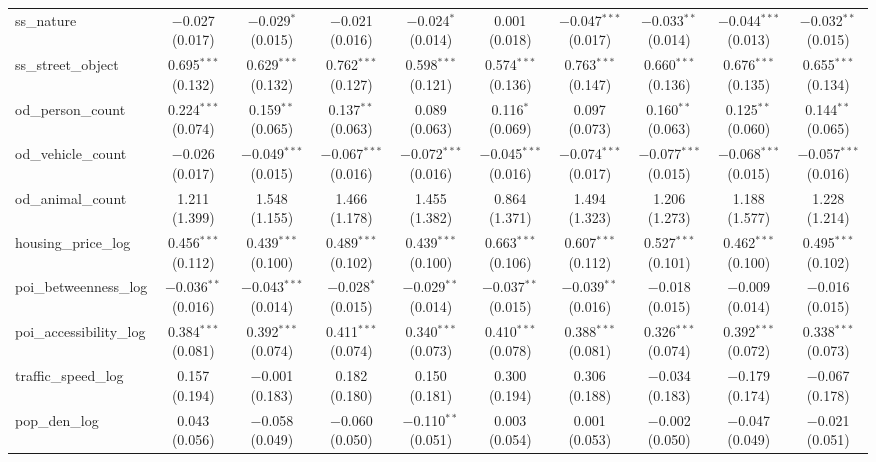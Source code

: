 \begin{table}[!htbp]
\begin{tabular}{@{\extracolsep{1pt}}lccccccccc}
  ss\_nature & $-$0.027 (0.017) & $-$0.029$^{*}$ (0.015) & $-$0.021 (0.016) & $-$0.024$^{*}$ (0.014) & 0.001 (0.018) & $-$0.047$^{***}$ (0.017) & $-$0.033$^{**}$ (0.014) & $-$0.044$^{***}$ (0.013) & $-$0.032$^{**}$ (0.015) \\ 
  ss\_street\_object & 0.695$^{***}$ (0.132) & 0.629$^{***}$ (0.132) & 0.762$^{***}$ (0.127) & 0.598$^{***}$ (0.121) & 0.574$^{***}$ (0.136) & 0.763$^{***}$ (0.147) & 0.660$^{***}$ (0.136) & 0.676$^{***}$ (0.135) & 0.655$^{***}$ (0.134) \\ 
  od\_person\_count & 0.224$^{***}$ (0.074) & 0.159$^{**}$ (0.065) & 0.137$^{**}$ (0.063) & 0.089 (0.063) & 0.116$^{*}$ (0.069) & 0.097 (0.073) & 0.160$^{**}$ (0.063) & 0.125$^{**}$ (0.060) & 0.144$^{**}$ (0.065) \\ 
  od\_vehicle\_count & $-$0.026 (0.017) & $-$0.049$^{***}$ (0.015) & $-$0.067$^{***}$ (0.016) & $-$0.072$^{***}$ (0.016) & $-$0.045$^{***}$ (0.016) & $-$0.074$^{***}$ (0.017) & $-$0.077$^{***}$ (0.015) & $-$0.068$^{***}$ (0.015) & $-$0.057$^{***}$ (0.016) \\ 
  od\_animal\_count & 1.211 (1.399) & 1.548 (1.155) & 1.466 (1.178) & 1.455 (1.382) & 0.864 (1.371) & 1.494 (1.323) & 1.206 (1.273) & 1.188 (1.577) & 1.228 (1.214) \\ 
  housing\_price\_log & 0.456$^{***}$ (0.112) & 0.439$^{***}$ (0.100) & 0.489$^{***}$ (0.102) & 0.439$^{***}$ (0.100) & 0.663$^{***}$ (0.106) & 0.607$^{***}$ (0.112) & 0.527$^{***}$ (0.101) & 0.462$^{***}$ (0.100) & 0.495$^{***}$ (0.102) \\ 
  poi\_betweenness\_log & $-$0.036$^{**}$ (0.016) & $-$0.043$^{***}$ (0.014) & $-$0.028$^{*}$ (0.015) & $-$0.029$^{**}$ (0.014) & $-$0.037$^{**}$ (0.015) & $-$0.039$^{**}$ (0.016) & $-$0.018 (0.015) & $-$0.009 (0.014) & $-$0.016 (0.015) \\ 
  poi\_accessibility\_log & 0.384$^{***}$ (0.081) & 0.392$^{***}$ (0.074) & 0.411$^{***}$ (0.074) & 0.340$^{***}$ (0.073) & 0.410$^{***}$ (0.078) & 0.388$^{***}$ (0.081) & 0.326$^{***}$ (0.074) & 0.392$^{***}$ (0.072) & 0.338$^{***}$ (0.073) \\ 
  traffic\_speed\_log & 0.157 (0.194) & $-$0.001 (0.183) & 0.182 (0.180) & 0.150 (0.181) & 0.300 (0.194) & 0.306 (0.188) & $-$0.034 (0.183) & $-$0.179 (0.174) & $-$0.067 (0.178) \\ 
  pop\_den\_log & 0.043 (0.056) & $-$0.058 (0.049) & $-$0.060 (0.050) & $-$0.110$^{**}$ (0.051) & 0.003 (0.054) & 0.001 (0.053) & $-$0.002 (0.050) & $-$0.047 (0.049) & $-$0.021 (0.051) \\ 

\end{tabular}
\end{table}
